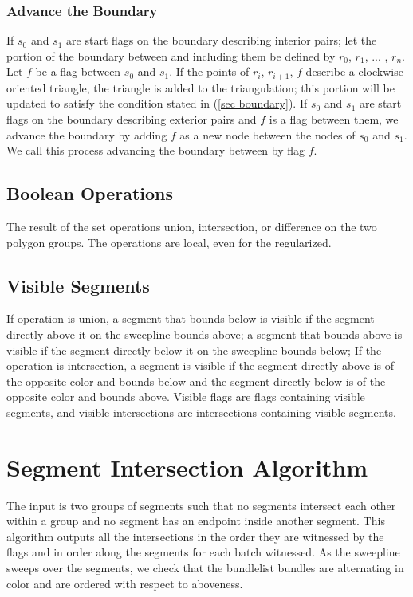 \documentclass[11pt]{article}
\begin{document}
\subsubsection{Advance the Boundary}
If $s_0$ and $s_1$ are start flags on the boundary describing interior pairs; let the portion of the boundary between and including them be defined by $r_0$, $r_1$, ... , $r_n$.
Let $f$ be a flag between $s_0$ and $s_1$.
If the points of $r_i$, $r_{i+1}$, $f$ describe a clockwise oriented triangle, the triangle is added to the triangulation; this portion will be updated to satisfy the condition stated in (\ref{sec boundary}).
If $s_0$ and $s_1$ are start flags on the boundary describing exterior pairs and $f$ is a flag between them,
we advance the boundary by adding $f$ as a new node between the nodes of $s_0$ and $s_1$.
We call this process advancing the boundary between by flag $f$.

\subsection{Boolean Operations}
The result of the set operations union, intersection, or difference on the two polygon groups.
The operations are local, even for the regularized. 

\subsection{Visible Segments}
If operation is union, a segment that bounds below is visible if the segment directly above it on the sweepline bounds above; a segment that bounds above is visible if the segment directly below it on the sweepline bounds below;
If the operation is intersection, a segment is visible if the segment directly above is of the opposite color and bounds below and the segment directly below is of the opposite color and bounds above.
Visible flags are flags containing visible segments, and visible intersections are intersections containing visible segments.

\section{Segment Intersection Algorithm} \label{sec inter}
The input is two groups of segments such that no segments intersect each other within a group and no segment has an endpoint inside another segment.
This algorithm outputs all the intersections in the order they are witnessed by the flags and in order along the segments for each batch witnessed.
As the sweepline sweeps over the segments, we check that the bundlelist bundles are alternating in color and are ordered with respect to aboveness.
\end{document}
